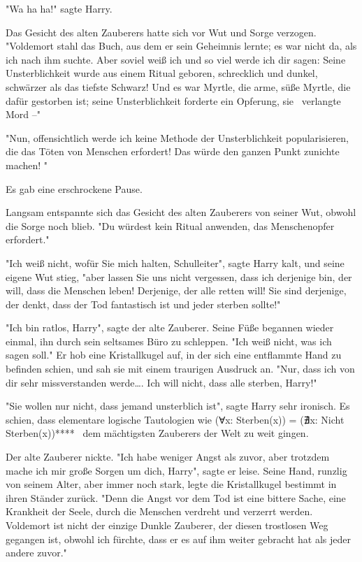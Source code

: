 {"Wa ha ha!" sagte Harry.

Das Gesicht des alten Zauberers hatte sich vor Wut und Sorge verzogen. "Voldemort stahl das Buch, aus dem er sein Geheimnis lernte; es war nicht da, als ich nach ihm suchte. Aber soviel weiß ich und so viel werde ich dir sagen: Seine Unsterblichkeit wurde aus einem Ritual geboren, schrecklich und dunkel, schwärzer als das tiefste Schwarz! Und es war Myrtle, die arme, süße Myrtle, die dafür gestorben ist; seine Unsterblichkeit forderte ein Opferung, sie ~verlangte Mord --"

"Nun, offensichtlich werde ich keine Methode der Unsterblichkeit popularisieren, die das Töten von Menschen erfordert! Das würde den ganzen Punkt zunichte machen! "

Es gab eine erschrockene Pause.

Langsam entspannte sich das Gesicht des alten Zauberers von seiner Wut, obwohl die Sorge noch blieb. "Du würdest kein Ritual anwenden, das Menschenopfer erfordert."

"Ich weiß nicht, wofür Sie mich halten, Schulleiter", sagte Harry kalt, und seine eigene Wut stieg, "aber lassen Sie uns nicht vergessen, dass ich derjenige bin, der will, dass die Menschen leben! Derjenige, der alle retten will! Sie sind derjenige, der denkt, dass der Tod fantastisch ist und jeder sterben sollte!"

"Ich bin ratlos, Harry", sagte der alte Zauberer. Seine Füße begannen wieder einmal, ihn durch sein seltsames Büro zu schleppen. "Ich weiß nicht, was ich sagen soll." Er hob eine Kristallkugel auf, in der sich eine entflammte Hand zu befinden schien, und sah sie mit einem traurigen Ausdruck an. "Nur, dass ich von dir sehr missverstanden werde…. Ich will nicht, dass alle sterben, Harry!"

"Sie wollen nur nicht, dass jemand unsterblich ist", sagte Harry sehr ironisch. Es schien, dass elementare logische Tautologien wie (Ɐx: Sterben(x)) = (∄x: Nicht Sterben(x))**** ~dem mächtigsten Zauberers der Welt zu weit gingen.

Der alte Zauberer nickte. "Ich habe weniger Angst als zuvor, aber trotzdem mache ich mir große Sorgen um dich, Harry", sagte er leise. Seine Hand, runzlig von seinem Alter, aber immer noch stark, legte die Kristallkugel bestimmt in ihren Ständer zurück. "Denn die Angst vor dem Tod ist eine bittere Sache, eine Krankheit der Seele, durch die Menschen verdreht und verzerrt werden. Voldemort ist nicht der einzige Dunkle Zauberer, der diesen trostlosen Weg gegangen ist, obwohl ich fürchte, dass er es auf ihm weiter gebracht hat als jeder andere zuvor."

}
